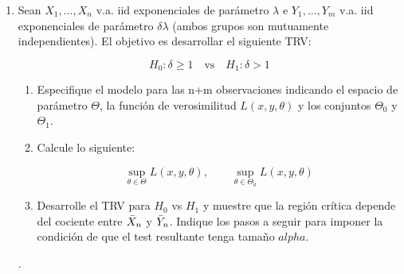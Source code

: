 \begin{enumerate}
\item Sean $X_1,...,X_n$ v.a. iid exponenciales de parámetro $\lambda$ e $Y_1,...,Y_m$ v.a. iid exponenciales de parámetro $\delta\lambda$ (ambos grupos son mutuamente independientes). El objetivo es desarrollar el siguiente TRV:

\[H_0:\delta\geq 1\quad \text{vs}\quad H_1:\delta >1\]

\begin{enumerate}
    \item Especifique el modelo para las n+m observaciones indicando el espacio de parámetro $\Theta$, la función de verosimilitud $L(x,y,\theta)$ y los conjuntos $\Theta_0$ y $\Theta_1$.
    
    \item Calcule lo siguiente:
    
    \[\sup\limits_{\theta\in\Theta}L(x,y,\theta), \qquad \sup\limits_{\theta\in\Theta_0}L(x,y,\theta)\]
    
    \item Desarrolle el TRV para $H_0$ vs $H_1$ y muestre que la región crítica depende del cociente entre $\Bar{X}_n$ y $\Bar{Y}_n$. Indique los pasos a seguir para imponer la condición de que el test resultante tenga tamaño $alpha$.
\end{enumerate}.


\end{enumerate}
 
 
